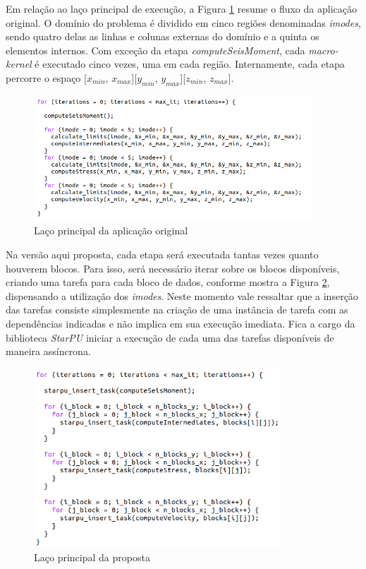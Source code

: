 \documentclass[cic,tc]{iiufrgs}
\begin{document}
Em relação ao laço principal de execução, a Figura \ref{fig:main_loop} resume o fluxo da aplicação original. O domínio do problema é dividido em cinco regiões denominadas \textit{imodes},
sendo quatro delas as linhas e colunas externas do domínio e a quinta os elementos internos. Com exceção da etapa \textit{computeSeisMoment}, cada \textit{macro-kernel} é executado cinco
vezes, uma em cada região. Internamente, cada etapa percorre o espaço [$x_{min}$, $x_{max}$][$y_{min}$, $y_{max}$][$z_{min}$, $z_{max}$].

\begin{figure}[!htb]
    \caption{Laço principal da aplicação original}
    \begin{center}
      \includegraphics[width=28em]{main_loop}
    \end{center}
    \label{fig:main_loop}
\end{figure}

Na versão aqui proposta, cada etapa será executada tantas vezes quanto houverem blocos. Para isso, será necessário iterar sobre os blocos disponíveis, criando uma tarefa para cada bloco
de dados, conforme mostra a Figura \ref{fig:new_main_loop}, dispensando a utilização dos \textit{imodes}. Neste momento vale ressaltar que a inserção das tarefas consiste
simplesmente na criação de uma instância de tarefa com as dependências indicadas e não implica em sua execução imediata. Fica a cargo da biblioteca \textit{StarPU} iniciar a execução
de cada uma das tarefas disponíveis de maneira assíncrona.

\begin{figure}[!htb]
    \caption{Laço principal da proposta}
    \begin{center}
      \includegraphics[width=25em]{new_main_loop}
    \end{center}
    \label{fig:new_main_loop}
\end{figure}
\end{document}
